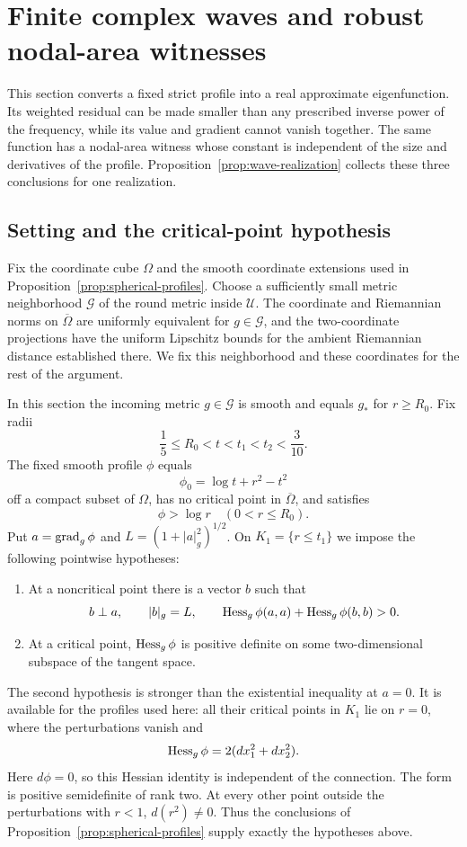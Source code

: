 \section{Finite complex waves and robust nodal-area witnesses}
\label{sec:waves}

This section converts a fixed strict profile into a real approximate
eigenfunction.  Its weighted residual can be made smaller than any prescribed inverse
power of the frequency, while its value and gradient cannot vanish together.
The same function has a nodal-area witness whose constant is independent
of the size and derivatives of the profile.
Proposition~\ref{prop:wave-realization} collects these three conclusions
for one realization.

\subsection{Setting and the critical-point hypothesis}

Fix the coordinate cube $\Omega$ and the smooth coordinate extensions
used in Proposition~\ref{prop:spherical-profiles}.  Choose a sufficiently
small metric neighborhood $\mathcal G$ of the round metric inside
$\mathcal U$.  The coordinate and Riemannian norms on
$\overline\Omega$ are uniformly equivalent for $g\in\mathcal G$, and
the two-coordinate projections have the uniform Lipschitz bounds
for the ambient Riemannian distance established there.  We fix this neighborhood and these
coordinates for the rest of the argument.

In this section the incoming metric $g\in\mathcal G$ is smooth and equals
$g_*$ for $r\ge R_0$.  Fix radii
\[
 \frac15\le R_0<t<t_1<t_2<\frac3{10}.
\]
The fixed smooth profile $\phi$ equals
\[
 \phi_0=\log t+r^2-t^2
\]
off a compact subset of $\Omega$, has no critical point in
$\overline\Omega$, and satisfies
\begin{equation}
 \phi>\log r\quad(0<r\le R_0).
 \label{eq:wave-envelope-margin}
\end{equation}
Put $a=\operatorname{grad}_g\phi$ and $L=(1+|a|_g^2)^{1/2}$.  On
$K_1=\{r\le t_1\}$ we impose the following pointwise hypotheses:
\begin{enumerate}
\item At a noncritical point there is a vector $b$ such that
\begin{equation}
 b\perp a,\qquad |b|_g=L,\qquad
 \operatorname{Hess}_g\phi(a,a)+\operatorname{Hess}_g\phi(b,b)>0.
 \label{eq:wave-strict-hypothesis}
\end{equation}
\item At a critical point, $\operatorname{Hess}_g\phi$ is positive definite on some
two-dimensional subspace of the tangent space.
\end{enumerate}
The second hypothesis is stronger than the existential inequality at
$a=0$.  It is available for the profiles used here: all their critical
points in $K_1$ lie on $r=0$, where the perturbations vanish and
\[
 \operatorname{Hess}_g\phi=2(dx_1^2+dx_2^2).
\]
Here $d\phi=0$, so this Hessian identity is independent of the connection.
The form is positive semidefinite of rank two.  At every other point
outside the perturbations with $r<1$, $d(r^2)\ne0$.  Thus the
conclusions of Proposition~\ref{prop:spherical-profiles} supply exactly
the hypotheses above.

